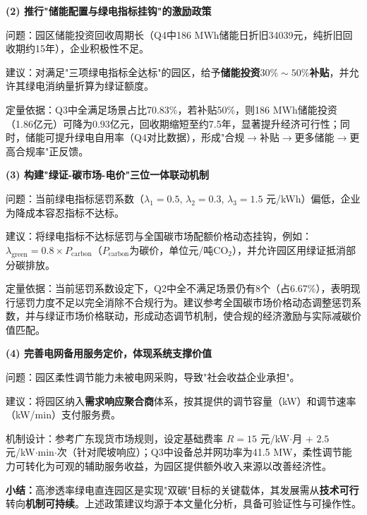 \documentclass[zihao=-4,a4paper]{ctexart} %
\begin{document}
	\textbf{(2) 推行"储能配置与绿电指标挂钩"的激励政策}
	
	\par\quad 问题：园区储能投资回收周期长（Q4中186 MWh储能日折旧34039元，纯折旧回收期约15年），企业积极性不足。
	
	\par\quad 建议：对满足"三项绿电指标全达标"的园区，给予\textbf{储能投资$30\%\sim50\%$补贴}，并允许其绿电消纳量折算为绿证额度。
	
	\par\quad 定量依据：Q3中全满足场景占比70.83\%，若补贴50\%，则186 MWh储能投资（1.86亿元）可降为0.93亿元，回收期缩短至约7.5年，显著提升经济可行性；同时，储能可提升绿电自用率（Q4对比数据），形成"合规$\to$补贴$\to$更多储能$\to$更高合规率"正反馈。
	
	\textbf{(3) 构建"绿证-碳市场-电价"三位一体联动机制}
	
	\par\quad 问题：当前绿电指标惩罚系数（$\lambda_1=0.5$, $\lambda_2=0.3$, $\lambda_3=1.5$ 元/kWh）偏低，企业为降成本容忍指标不达标。
	
	\par\quad 建议：将绿电指标不达标惩罚与全国碳市场配额价格动态挂钩，例如：$\lambda_{\text{green}} = 0.8 \times P_{\text{carbon}}$（$P_{\text{carbon}}$为碳价，单位元/吨CO$_2$），并允许园区用绿证抵消部分碳排放。
	
	\par\quad 定量依据：当前惩罚系数设定下，Q2中全不满足场景仍有8个（占6.67\%），表明现行惩罚力度不足以完全消除不合规行为。建议参考全国碳市场价格动态调整惩罚系数，并与绿证市场价格联动，形成动态调节机制，使合规的经济激励与实际减碳价值匹配。
	
	\textbf{(4) 完善电网备用服务定价，体现系统支撑价值}
	
	\par\quad 问题：园区柔性调节能力未被电网采购，导致"社会收益企业承担"。
	
	\par\quad 建议：将园区纳入\textbf{需求响应聚合商}体系，按其提供的调节容量（kW）和调节速率（kW/min）支付服务费。
	
	\par\quad 机制设计：参考广东现货市场规则，设定基础费率 $R = 15$ 元/kW$\cdot$月 $+$ $2.5$ 元/kW$\cdot$min$\cdot$次（针对爬坡响应）；Q3中设备总并网功率为41.5 MW，柔性调节能力可转化为可观的辅助服务收益，为园区提供额外收入来源以改善经济性。
	
	\vspace{0.5em}
	\noindent\textbf{小结：}高渗透率绿电直连园区是实现"双碳"目标的关键载体，其发展需从\textbf{技术可行}转向\textbf{机制可持续}。上述政策建议均源于本文量化分析，具备可验证性与可操作性。
	
\end{document}
